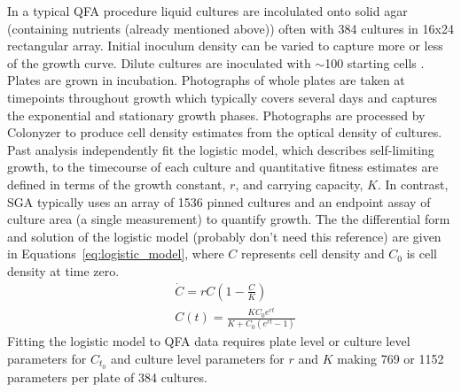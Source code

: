 In a typical QFA procedure liquid cultures are incolulated onto solid
agar (containing nutrients (already mentioned above)) often with 384
cultures in 16x24 rectangular array. Initial inoculum density can be
varied to capture more or less of the growth curve. Dilute cultures
are inoculated with \(\sim\)100 starting cells
\citep{Addinall2011}. Plates are grown in incubation. Photographs of
whole plates are taken at timepoints throughout growth which typically
covers several days and captures the exponential and stationary growth
phases. Photographs are processed by Colonyzer \citep{Lawless2010} to
produce cell density estimates from the optical density of
cultures. Past analysis independently fit the logistic model, which
describes self-limiting growth, to the timecourse of each culture and
quantitative fitness estimates are defined in terms of the growth
constant, \(r\), and carrying capacity, \(K\). In contrast, SGA
typically uses an array of 1536 pinned cultures and an endpoint assay
of culture area (a single measurement) to quantify growth. The the
differential form and solution of the logistic model
\citep{Verhulst1845} (probably don't need this reference) are given in
Equations~\ref{eq:logistic_model}, where \(C\) represents cell density
and \(C_0\) is cell density at time zero.
\begin{subequations}
  \label{eq:logistic_model}
  \begin{align}
    &\dot{C} = rC\left(1 - \frac{C}{K}\right)\\
    &C(t) = \frac{KC_{0}e^{rt}}{K + C_{0}(e^{rt}-1)}
  \end{align}
\end{subequations}
%
Fitting the logistic model to QFA data requires plate level or culture
level parameters for \(C_{t_{0}}\) and culture level parameters for \(r\)
and \(K\) making 769 or 1152 parameters per plate of 384 cultures.

